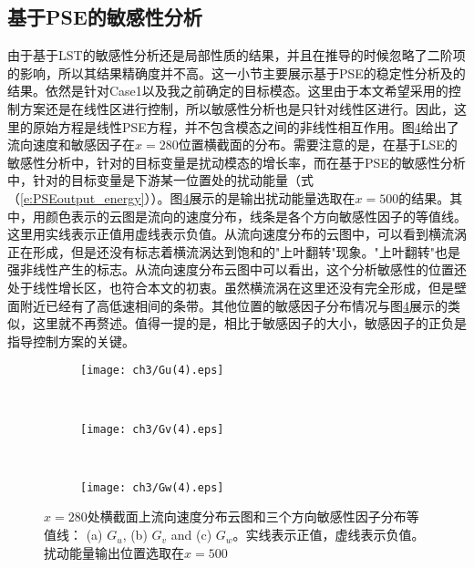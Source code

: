 \subsection{基于PSE的敏感性分析}
由于基于LST的敏感性分析还是局部性质的结果，并且在推导的时候忽略了二阶项的影响，所以其结果精确度并不高。这一小节主要展示基于PSE的稳定性分析及的结果。依然是针对Case1以及我之前确定的目标模态。这里由于本文希望采用的控制方案还是在线性区进行控制，所以敏感性分析也是只针对线性区进行。因此，这里的原始方程是线性PSE方程，并不包含模态之间的非线性相互作用。图\ref{f:Guvw1}给出了流向速度和敏感因子在$x =280$位置横截面的分布。需要注意的是，在基于LSE的敏感性分析中，针对的目标变量是扰动模态的增长率，而在基于PSE的敏感性分析中，针对的目标变量是下游某一位置处的扰动能量（式（\ref{e:PSEoutput_energy}））。图\ref{f:Guvw1}展示的是输出扰动能量选取在$x =500$的结果。其中，用颜色表示的云图是流向的速度分布，线条是各个方向敏感性因子的等值线。这里用实线表示正值用虚线表示负值。从流向速度分布的云图中，可以看到横流涡正在形成，但是还没有标志着横流涡达到饱和的"上叶翻转"现象。"上叶翻转"也是强非线性产生的标志。从流向速度分布云图中可以看出，这个分析敏感性的位置还处于线性增长区，也符合本文的初衷。虽然横流涡在这里还没有完全形成，但是壁面附近已经有了高低速相间的条带。其他位置的敏感因子分布情况与图\ref{f:Guvw1}展示的类似，这里就不再赘述。值得一提的是，相比于敏感因子的大小，敏感因子的正负是指导控制方案的关键。
\begin{figure}[H]
  \centering
  \begin{subfigure}{0.8\textwidth}
  \texttt{[image: ch3/Gu(4).eps]}
  \caption{\label{f:Gu1}}
  \end{subfigure}\\
  \bigskip
  \begin{subfigure}{0.8\textwidth}
  \texttt{[image: ch3/Gv(4).eps]}
  \caption{\label{f:Gv1}}
  \end{subfigure}\\
  \bigskip
  \begin{subfigure}{0.8\textwidth}
  \texttt{[image: ch3/Gw(4).eps]}
  \caption{\label{f:Gw1}}
  \end{subfigure}
  \caption{$x =280$处横截面上流向速度分布云图和三个方向敏感性因子分布等值线： (a) $G_u$, (b) $G_v$ and (c) $G_w$。实线表示正值，虚线表示负值。扰动能量输出位置选取在$x =500$}\label{f:Guvw1}
\end{figure}
